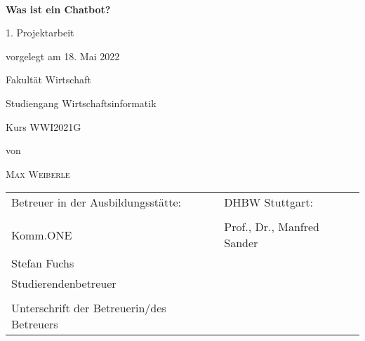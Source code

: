 \newcommand{\typMeinerArbeit}{1. Projektarbeit} 

\newcommand{\themaMeinerArbeit}{Was ist ein Chatbot?}

\newcommand{\meinName}{Max Weiberle}

\thispagestyle{empty}

\begin{spacing}{1}
\begin{center}	
~\vspace{0mm}

{\sffamily
\LARGE  
\textbf{Was ist ein Chatbot?}

\bigskip
\textbf{}
}


\vspace{15mm}

{\Large \typMeinerArbeit}

\vspace{1cm}

vorgelegt am 18. Mai 2022

\vspace{15mm}

Fakultät Wirtschaft
\medskip

Studiengang Wirtschaftsinformatik
\medskip

Kurs WWI2021G

\vspace{10mm}

von

\vspace{10mm}

{\large\textsc{\meinName}}

\vspace{10mm}
\end{center}

\vfill

\begin{tabular}{ll}
Betreuer in der Ausbildungsstätte: & DHBW Stuttgart: \\
\hspace{0.4\linewidth} & \\
Komm.ONE & Prof., Dr., Manfred Sander \\
Stefan Fuchs \\
Studierendenbetreuer \\
\\
Unterschrift der Betreuerin/des Betreuers \\
\end{tabular}



\end{spacing}
